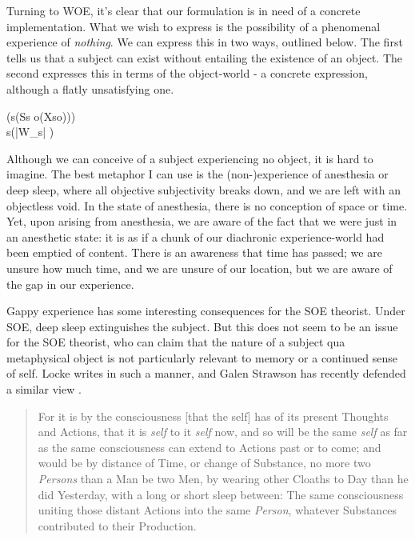 \documentclass[leqno]{article}
\newcounter{lemma}
\begin{document}
	Turning to WOE, it's clear that our formulation is in need of a concrete
	implementation. What we wish to express is the possibility of a phenomenal experience
	of \emph{nothing}. We can express this in two ways, outlined below. The first tells
	us that a subject can exist without entailing the existence of an object. The
	second expresses this in terms of the object-world - a concrete expression, although
	a flatly unsatisfying one.
	\begin{lemmalist}
		[WOE.][woe] \label{lemma:woe1} (\exists s(Ss \land \neg \exists o(Xso)))
		\\ \label{lemma:woe2} \forall s(|W_s| )
	\end{lemmalist}

	Although we can conceive of a subject experiencing no object, it is hard to
	imagine. The best metaphor I can use is the (non-)experience of anesthesia or deep
	sleep, where all objective subjectivity breaks down, and we are left with an objectless
	void. In the state of anesthesia, there is no conception of space or time. Yet,
	upon arising from anesthesia, we are aware of the fact that we were just in an
	anesthetic state: it is as if a chunk of our diachronic experience-world had been
	emptied of content. There is an awareness that time has passed; we are unsure how
	much time, and we are unsure of our location, but we are aware of the gap in our
	experience.

	Gappy experience has some interesting consequences for the SOE theorist. Under
	SOE, deep sleep extinguishes the subject. But this does not seem to be an
	issue for the SOE theorist, who can claim that the nature of a subject qua metaphysical
	object is not particularly relevant to memory or a continued sense of self.
	Locke writes in such a manner, and Galen Strawson has recently defended a similar
	view \autocite[ch. 12]{strawson2017}.

	\blockquote[{\cite[2.27.10]{locke2000}}]{ For it is by the consciousness [that the self] has of its present Thoughts and Actions, that it is \emph{self} to it \emph{self} now, and so will be the same \emph{self} as far as the same consciousness can extend to Actions past or to come; and would be by distance of Time, or change of Substance, no more two \emph{Persons} than a Man be two Men, by wearing other Cloaths to Day than he did Yesterday, with a long or short sleep between: The same consciousness uniting those distant Actions into the same \emph{Person}, whatever Substances contributed to their Production. }
\end{document}

